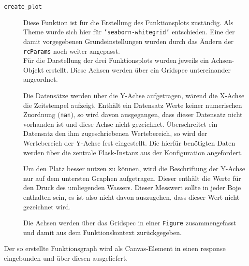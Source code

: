 \begin{description}
 \item [\texttt{create\_plot}]
    Diese Funktion ist für die Erstellung des Funktionsplots zuständig. Als Theme wurde sich hier für \texttt{'seaborn-whitegrid'} entschieden. Eine der damit vorgegebenen Grundeinstellungen wurden durch das Ändern der \texttt{rcParams} noch weiter angepasst.\\
    Für die Darstellung der drei Funktionsplots wurden jeweils ein Achsen-Objekt erstellt. Diese Achsen werden über ein Gridspec untereinander angeordnet.

    Die Datensätze werden über die Y-Achse aufgetragen, wärend die X-Achse die Zeitstempel aufzeigt. Enthält ein Datensatz Werte keiner numerischen Zuordnung (\texttt{\gls{nan}}), so wird davon ausgegangen, dass dieser Datensatz nicht vorhanden ist und diese Achse nicht gezeichnet. Überschreitet ein Datensatz den ihm zugeschriebenen Wertebereich, so wird der Wertebereich der Y-Achse fest eingestellt. Die hierfür benötigten Daten werden über die zentrale Flask-Instanz aus der Konfiguration angefordert.

    Um den Platz besser nutzen zu können, wird die Beschriftung der Y-Achse nur auf dem untersten Graphen aufgetragen. Dieser enthält die Werte für den Druck des umliegenden Wassers. Dieser Messwert sollte in jeder Boje enthalten sein, es ist also nicht davon auszugehen, dass dieser Wert nicht gezeichnet wird.

    Die Achsen werden über das Gridspec in einer \texttt{Figure} zusammengefasst und damit aus dem Funktionskontext zurückgegeben.
\end{description}

Der so erstellte Funktionsgraph wird als Canvas-Element in einen response eingebunden und über diesen ausgeliefert.







